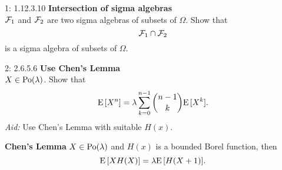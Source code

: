 \documentclass[a4paper,twoside=false,abstract=false,numbers=noenddot,
titlepage=false,headings=small,parskip=half,version=last]{scrartcl}
\begin{document}

\begin{exercise}{1: 1.12.3.10} {\bf Intersection of sigma algebras}   \\
    $\mathcal{F}_1$ and $\mathcal{F}_2$ are two sigma algebras of subsets of $\Omega$. Show
    that
    \begin{equation}
        \mathcal{F}_1 \cap \mathcal{F}_2
    \end{equation}
    is a sigma algebra of subsets of $\Omega$.
\end{exercise}
\begin{solution}
\end{solution}
\pagebreak

\begin{exercise}{2: 2.6.5.6} \textbf{Use Chen's Lemma} \\
    $X \in \text{Po}(\lambda)$. Show that
    \begin{equation}
        {\rm E}\,[X^n] =
        \lambda \sum\limits_{k=0}^{n-1} \binom{n-1}{k}{\rm E}\,[X^k].
    \end{equation}
    \textit{Aid:} Use Chen's Lemma with suitable $H(x)$.
\end{exercise}
\begin{solution}
    \begin{lemma}
        \label{lemma:chen}  %
        \textbf{Chen's Lemma} $X \in \text{Po}(\lambda)$ and $H(x)$ is a bounded
        Borel function, then
        \begin{equation}
            \label{eq:chen}
            {\rm E}\,[XH(X)] = \lambda{\rm E}\,[H(X+1)].
        \end{equation}
    \end{lemma}
\end{solution}
\pagebreak
\end{document}
